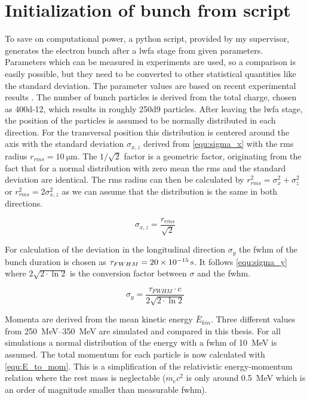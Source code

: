 \documentclass[bachelor_thesis]{subfiles}
\begin{document}
\section{Initialization of bunch from script}\label{chap:init}
To save on computational power, a python script, provided by my supervisor, generates the electron bunch after a \gls{lwfa} stage from given parameters. Parameters which can be measured in experiments are used,
so a comparison is easily possible, but they need to be converted to other statistical quantities like the standard deviation. The parameter values are based on recent experimental results \cite{Kurz2021, Schoebel2022, Cabadag2021}.
The number of bunch particles is derived from the total charge, chosen as \qty{400d-12}{\C}, which results in roughly \num{250d9} particles. After leaving the \gls{lwfa} stage, the position of the particles is assumed to be normally distributed in each direction.
For the transversal position this distribution is centered around the axis with the standard deviation $\sigma_{x,z}$ derived from \autoref{equ:sigma_x} with the \gls{rms} radius $r_{rms}=\qty{10}{\um}$.
The $1/\sqrt{2}$ factor is a geometric factor, originating from the fact that for a normal distribution with zero mean the \gls{rms} and the standard deviation are identical. 
The \gls{rms} radius can then be calculated by $r_{rms}^2=\sigma_{x}^2 + \sigma_{z}^2$ or $r_{rms}^2=2\sigma_{x,z}^2$ as we can assume that the distribution is the same in both directions.

\begin{equation}
	\sigma_{x,z}=\frac{r_{rms}}{\sqrt{2}} 
	\label{equ:sigma_x}
\end{equation}

For calculation of the deviation in the longitudinal direction $\sigma_y$ the \gls{fwhm} of the bunch duration is chosen as $\tau_{FWHM}=\qty{20d-15}{\s}$. 
It follows \autoref{equ:sigma_y} where $2\sqrt{2\cdot\ln{2}}$ is the conversion factor between $\sigma$ and the \gls{fwhm}.

\begin{equation}
	\sigma_{y}=\frac{\tau_{FWHM}\cdot c}{2\sqrt{2\cdot\ln{2}}}
	\label{equ:sigma_y}
\end{equation}

Momenta are derived from the mean kinetic energy $\bar{E}_{kin}$. Three different values from \qtyrange{250}{350}{\MeV} are simulated and compared in this thesis.
For all simulations a normal distribution of the energy with a \gls{fwhm} of \qty{10}{\MeV} is assumed. The total momentum for each particle is now calculated with \autoref{equ:E_to_mom}.
This is a simplification of the relativistic energy-momentum relation where the rest mass is neglectable ($m_{e}c^2$ is only around \qty{0.5}{\MeV} which is an order of magnitude smaller than measurable \gls{fwhm}).
\end{document}
